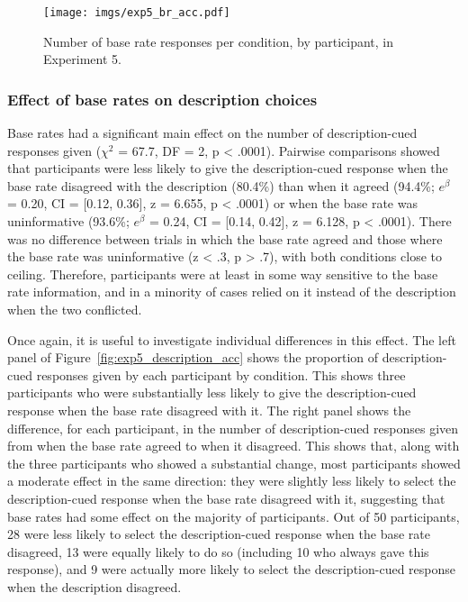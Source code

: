 \begin{figure}[ht]
  \centering
  \texttt{[image: imgs/exp5\_br\_acc.pdf]}
  \caption[Individual differences in the effect of descriptions
  on participants' responses, Experiment 5.]{
    Number of base rate responses per condition, by participant, in Experiment 5.
    \label{fig:exp5_br_acc} }
\end{figure}

\subsubsection{Effect of base rates on description choices}


Base rates had a significant main effect on
the number of description-cued responses given
($\chi^2$  = 67.7, DF = 2, p < .0001).
Pairwise comparisons showed that participants were
less likely to give the description-cued response
when the base rate disagreed with the description (80.4\%)
than when it agreed (94.4\%;
$e^{\beta}$ = 0.20, CI = [0.12, 0.36], z = 6.655, p < .0001)
or when the base rate was uninformative (93.6\%;
$e^{\beta}$ = 0.24, CI = [0.14, 0.42], z = 6.128, p < .0001).
There was no difference between trials in which the base rate agreed
and those where the base rate was uninformative (z < .3, p > .7),
with both conditions close to ceiling.
Therefore, participants were at least in some way
sensitive to the base rate information, and in a minority of cases
relied on it instead of the description when the two conflicted.

Once again, it is useful to investigate individual differences in this effect.
The left panel of Figure~\ref{fig:exp5_description_acc} shows
the proportion of description-cued responses given by each participant by condition.
This shows three participants who were substantially less likely
to give the description-cued response when the base rate disagreed with it.
The right panel shows the difference, for each participant,
in the number of description-cued responses given
from when the base rate agreed to when it disagreed.
This shows that, along with the 
three participants who showed a substantial change,
most participants showed a moderate effect in the same direction:
they were slightly less likely to select
the description-cued response when the base rate disagreed with it,
suggesting that base rates had some effect on the majority of participants.
Out of 50 participants, 28 were less likely
to select the description-cued response when the base rate disagreed,
13 were equally likely to do so (including 10 who always gave this response),
and 9 were actually more likely to select the description-cued response
when the description disagreed.

